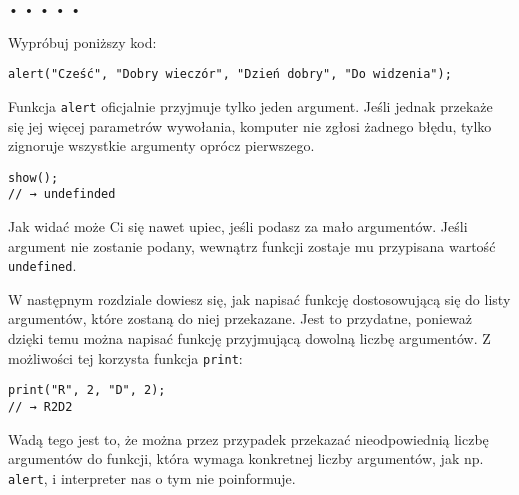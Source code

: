     
  
  
\begin{center}
• • • • •
\end{center}
  
    
Wypróbuj poniższy kod:

    
\begin{verbatim} 
alert("Cześć", "Dobry wieczór", "Dzień dobry", "Do widzenia");
 \end{verbatim}
    
Funkcja \texttt{alert} oficjalnie przyjmuje tylko jeden argument. Jeśli jednak przekaże się jej więcej parametrów wywołania, komputer nie zgłosi żadnego błędu, tylko zignoruje wszystkie argumenty oprócz pierwszego.

    
\begin{verbatim} 
show();
// → undefinded
\end{verbatim}
    
Jak widać może Ci się nawet upiec, jeśli podasz za mało argumentów. Jeśli argument nie zostanie podany, wewnątrz funkcji zostaje mu przypisana wartość \texttt{undefined}.

    
W następnym rozdziale dowiesz się, jak napisać funkcję dostosowującą się do listy argumentów, które zostaną do niej przekazane. Jest to przydatne, ponieważ dzięki temu można napisać funkcję przyjmującą dowolną liczbę argumentów. Z możliwości tej korzysta funkcja \texttt{print}:

    
\begin{verbatim} 
print("R", 2, "D", 2);
// → R2D2
\end{verbatim}
    
Wadą tego jest to, że można przez przypadek przekazać nieodpowiednią liczbę argumentów do funkcji, która wymaga konkretnej liczby argumentów, jak np. \texttt{alert}, i interpreter nas o tym nie poinformuje.